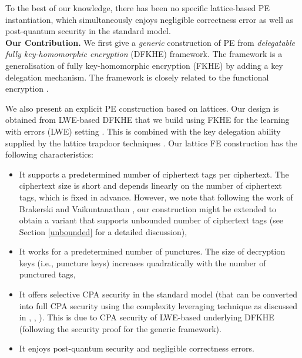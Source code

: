 \documentclass[runningheads,10pt]{llncs}
\begin{document}
To the best of our knowledge, there has been no specific lattice-based PE instantiation, which simultaneously enjoys  negligible correctness error as well as post-quantum security in the standard model.\\

 
 
\noindent \textbf{Our Contribution.}  
We first give a \textit{generic} construction of PE from \textit{delegatable fully key-homomorphic encryption} (DFKHE) framework. 
The framework is a generalisation of 
fully key-homomorphic encryption (FKHE) \cite{BGG+14} by adding
a key delegation mechanism.
The framework is closely related to the functional encryption \cite{BSW11}. 

We also present an  explicit  PE construction based on lattices.
Our design is obtained from LWE-based  DFKHE that we build using
FKHE for the learning with errors (LWE) setting \cite{BGG+14}. 
This is combined with the key delegation ability supplied by the lattice trapdoor techniques \cite{GPV08, CHKP10, ABB10}.  
Our lattice FE construction has the following characteristics:
\begin{itemize}
	\item It supports a predetermined number of ciphertext tags per ciphertext. 
		The ciphertext size is short and depends linearly on the number of ciphertext tags, 
		which is fixed in advance. However, we note that following the work of Brakerski and Vaikuntanathan \cite{BV16}, 
		our construction  might be extended to obtain a variant that supports unbounded number of 
		ciphertext tags (see Section \ref{unbounded} for a detailed discussion),
	\item
It works for a predetermined number of punctures.
		The size of decryption keys (i.e., puncture keys) increases quadratically with the number of punctured tags,
	\item  It offers selective CPA security in the standard model (that can be converted into full CPA security 
		using the complexity leveraging technique as discussed in \cite{CHK04}, \cite{Kil06}\cite{BB11}, \cite{BGG+14}).  
		This is due to CPA security of LWE-based underlying DFKHE (following the security proof for the generic framework).
	\item It enjoys post-quantum security and negligible correctness errors.
\end{itemize} 
\end{document}
